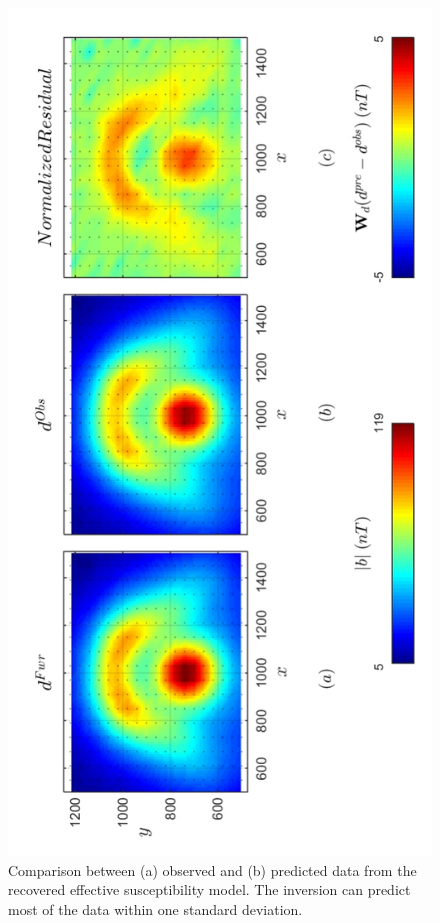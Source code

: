 \begin{figure}[h!]
\centering
\includegraphics[scale=0.52, angle =270]{3D_Inv_l2l2_pred_kEff.pdf}
\caption{Comparison between (a) observed and (b) predicted data from the recovered effective susceptibility model. The inversion can predict most of the data within one standard deviation.}
\label{fig:3D_Inv_l2l2_pred_kEff}
\end{figure}

